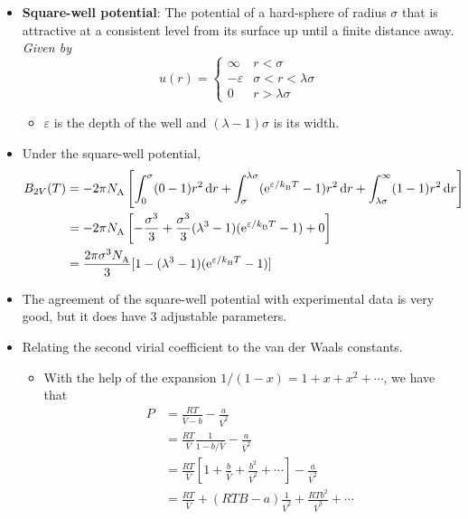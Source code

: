 \documentclass[../notes.tex]{subfiles}
\begin{document}
\begin{itemize}
    \item \textbf{Square-well potential}: The potential of a hard-sphere of radius $\sigma$ that is attractive at a consistent level from its surface up until a finite distance away. \emph{Given by}
    \begin{equation*}
        u(r) =
        \begin{cases}
            \infty & r<\sigma\\
            -\varepsilon & \sigma<r<\lambda\sigma\\
            0 & r>\lambda\sigma
        \end{cases}
    \end{equation*}
    \begin{itemize}
        \item $\varepsilon$ is the depth of the well and $(\lambda-1)\sigma$ is its width.
    \end{itemize}
    \item Under the square-well potential,
    \begin{align*}
        B_{2V}(T) &= -2\pi\NA\left[ \int_0^\sigma(0-1)r^2\dd{r}+\int_\sigma^{\lambda\sigma}(\e[\varepsilon/\kB T]-1)r^2\dd{r}+\int_{\lambda\sigma}^\infty(1-1)r^2\dd{r} \right]\\
        &= -2\pi\NA\left[ -\frac{\sigma^3}{3}+\frac{\sigma^3}{3}(\lambda^3-1)(\e[\varepsilon/\kB T]-1)+0 \right]\\
        &= \frac{2\pi\sigma^3\NA}{3}[1-(\lambda^3-1)(\e[\varepsilon/\kB T]-1)]
    \end{align*}
    \item The agreement of the square-well potential with experimental data is very good, but it does have 3 adjustable parameters.
    \item Relating the second virial coefficient to the van der Waals constants.
    \begin{itemize}
        \item With the help of the expansion $1/(1-x)=1+x+x^2+\cdots$, we have that
        \begin{align*}
            P &= \frac{RT}{\overline{V}-b}-\frac{a}{\overline{V}^2}\\
            &= \frac{RT}{\overline{V}}\frac{1}{1-b/\overline{V}}-\frac{a}{\overline{V}^2}\\
            &= \frac{RT}{\overline{V}}\left[ 1+\frac{b}{\overline{V}}+\frac{b^2}{\overline{V}^2}+\cdots \right]-\frac{a}{\overline{V}^2}\\
            &= \frac{RT}{\overline{V}}+(RTB-a)\frac{1}{\overline{V}^2}+\frac{RTb^2}{\overline{V}^3}+\cdots

\end{align*}
\end{itemize}
\end{itemize}
\end{document}

